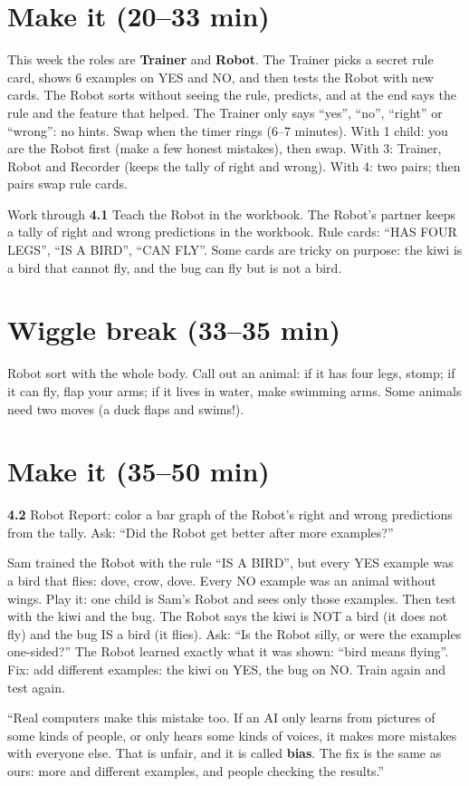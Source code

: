 \section{Make it (20--33 min)}
\begin{pairroles}
This week the roles are \textbf{Trainer} and \textbf{Robot}. The Trainer picks a secret rule card, shows 6 examples on YES and NO, and then tests the Robot with new cards. The Robot sorts without seeing the rule, predicts, and at the end says the rule and the feature that helped. The Trainer only says \enquote{yes}, \enquote{no}, \enquote{right} or \enquote{wrong}: no hints. Swap when the timer rings (6--7 minutes). With 1 child: you are the Robot first (make a few honest mistakes), then swap. With 3: Trainer, Robot and Recorder (keeps the tally of right and wrong). With 4: two pairs; then pairs swap rule cards.
\end{pairroles}

Work through \textbf{4.1} Teach the Robot in the workbook. The Robot's partner keeps a tally of right and wrong predictions in the workbook. Rule cards: \enquote{HAS FOUR LEGS}, \enquote{IS A BIRD}, \enquote{CAN FLY}. Some cards are tricky on purpose: the kiwi is a bird that cannot fly, and the bug can fly but is not a bird.

\section{Wiggle break (33--35 min)}
Robot sort with the whole body. Call out an animal: if it has four legs, stomp; if it can fly, flap your arms; if it lives in water, make swimming arms. Some animals need two moves (a duck flaps and swims!).

\section{Make it (35--50 min)}
\textbf{4.2} Robot Report: color a bar graph of the Robot's right and wrong predictions from the tally. Ask: \enquote{Did the Robot get better after more examples?}

\begin{bughunt}
Sam trained the Robot with the rule \enquote{IS A BIRD}, but every YES example was a bird that flies: dove, crow, dove. Every NO example was an animal without wings. Play it: one child is Sam's Robot and sees only those examples. Then test with the kiwi and the bug. The Robot says the kiwi is NOT a bird (it does not fly) and the bug IS a bird (it flies). Ask: \enquote{Is the Robot silly, or were the examples one-sided?} The Robot learned exactly what it was shown: \enquote{bird means flying}. Fix: add different examples: the kiwi on YES, the bug on NO. Train again and test again.

\enquote{Real computers make this mistake too. If an AI only learns from pictures of some kinds of people, or only hears some kinds of voices, it makes more mistakes with everyone else. That is unfair, and it is called \textbf{bias}. The fix is the same as ours: more and different examples, and people checking the results.}
\end{bughunt}


